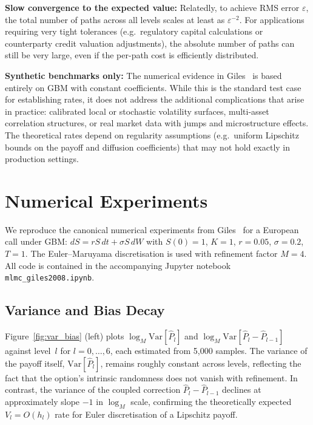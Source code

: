 \documentclass[11pt]{article}
\begin{document}
\textbf{Slow convergence to the expected value:}
Relatedly, to achieve RMS error $\varepsilon$, the total number of paths across all levels scales at least as $\varepsilon^{-2}$. For applications requiring very tight tolerances (e.g.\ regulatory capital calculations or counterparty credit valuation adjustments), the absolute number of paths can still be very large, even if the per-path cost is efficiently distributed.

\textbf{Synthetic benchmarks only:}
The numerical evidence in Giles~\cite{giles2008} is based entirely on GBM with constant coefficients. While this is the standard test case for establishing rates, it does not address the additional complications that arise in practice: calibrated local or stochastic volatility surfaces, multi-asset correlation structures, or real market data with jumps and microstructure effects. The theoretical rates depend on regularity assumptions (e.g.\ uniform Lipschitz bounds on the payoff and diffusion coefficients) that may not hold exactly in production settings.

\section{Numerical Experiments}\label{sec:experiments}

We reproduce the canonical numerical experiments from Giles~\cite{giles2008} for a European call under GBM: $dS = rS\,dt + \sigma S\,dW$ with $S(0) = 1$, $K = 1$, $r = 0.05$, $\sigma = 0.2$, $T = 1$. The Euler--Maruyama discretisation is used with refinement factor $M = 4$. All code is contained in the accompanying Jupyter notebook \texttt{mlmc\_giles2008.ipynb}.

\subsection{Variance and Bias Decay}\label{subsec:var_bias}

Figure~\ref{fig:var_bias} (left) plots $\log_{M}\mathrm{Var}[\hat{P}_{l}]$ and $\log_{M}\mathrm{Var}[\hat{P}_{l} - \hat{P}_{l-1}]$ against level~$l$ for $l = 0,\ldots,6$, each estimated from 5{,}000 samples. The variance of the payoff itself, $\mathrm{Var}[\hat{P}_{l}]$, remains roughly constant across levels, reflecting the fact that the option's intrinsic randomness does not vanish with refinement. In contrast, the variance of the coupled correction $\hat{P}_{l} - \hat{P}_{l-1}$ declines at approximately slope $-1$ in $\log_{M}$ scale, confirming the theoretically expected $V_{l} = O(h_{l})$ rate for Euler discretisation of a Lipschitz payoff.
\end{document}
